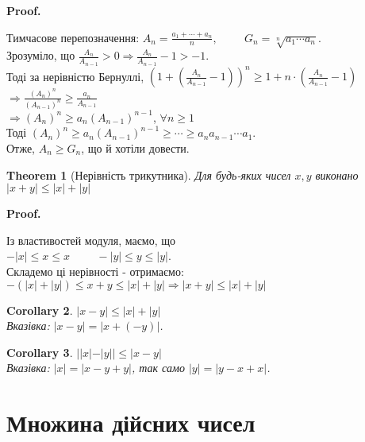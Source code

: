 \documentclass[a4paper, 14pt]{article}
\makeatletter
\def\huge{\displaystyle}
\def\qed{$\blacksquare$}
\theoremstyle{theoremdd}
\newtheorem{theorem}{Theorem}[subsection]
\theoremstyle{theoremdd}
\theoremstyle{theoremdd}
\theoremstyle{theoremdd}
\theoremstyle{theoremdd}
\theoremstyle{theoremdd}
\theoremstyle{theoremdd}
\theoremstyle{theoremdd}
\newtheorem{corollary}[theorem]{Corollary}
\renewenvironment{proof}[1][Proof.\\]{\par
\pushQED{\hfill \qed}%
\normalfont \topsep6\p@\@plus6\p@\relax
\trivlist
\item\relax
{\bfseries
#1\@addpunct{.}}\hspace\labelsep\ignorespaces
}{%
\popQED\endtrivlist\@endpefalse
}
\makeatother
\begin{document}
	\begin{proof}
	Тимчасове перепозначення: $\huge A_n = \frac{a_1+\cdots+a_n}{n}, \hspace{1cm} G_n = \sqrt[n]{a_1 \cdots a_n}$.\\
	Зрозуміло, що $\huge \frac{A_n}{A_{n-1}} > 0 \Rightarrow \frac{A_n}{A_{n-1}}-1>-1$. \\ Тоді за нерівністю Бернуллі,
	$\huge \left(1+ \left(\frac{A_n}{A_{n-1}} -1 \right) \right)^n \geq 1 + n \cdot \left(\frac{A_n}{A_{n-1}} -1 \right)$
	$\Rightarrow \huge \frac{(A_n)^n}{(A_{n-1})^n} \geq \frac{a_n}{A_{n-1}}$\\
	$\Rightarrow \huge (A_n)^n \geq a_n (A_{n-1})^{n-1}$, $\forall n \geq 1$ \\ Тоді $(A_n)^n \geq a_n (A_{n-1})^{n-1} \geq \cdots \geq a_n a_{n-1} \cdots a_1$. \\ Отже, $A_n \geq G_n$, що й хотіли довести.
	\end{proof}
	
	\begin{theorem}[Нерівність трикутника]
	Для будь-яких чисел $x,y$ виконано $|x+y| \leq |x| + |y|$
	\end{theorem}
	
	\begin{proof}
	Із властивостей модуля, маємо, що\\
	$-|x| \leq x \leq x \hspace{1cm} -|y| \leq y \leq |y|$.\\
	Складемо ці нерівності - отримаємо:\\
	$-(|x|+|y|) \leq x+y \leq |x|+|y| \Rightarrow |x+y| \leq |x| + |y|$
	\end{proof}
	
	\begin{corollary}
	$|x-y| \leq |x| + |y|$\\
	\textit{Вказівка: $|x-y| = |x+(-y)|$.}
	\end{corollary}
	
	\begin{corollary}
	$||x|-|y|| \leq |x-y|$\\
	\textit{Вказівка: $|x| = |x-y+y|$, так само $|y| = |y-x+x|$.}
	\end{corollary}
	\newpage
	
    
	\section{Множина дійсних чисел}
\end{document}
